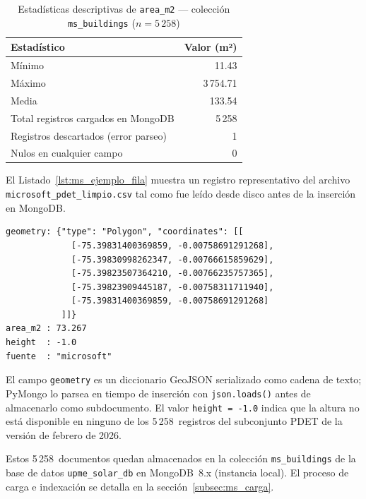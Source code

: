 \documentclass[12pt, a4paper]{report}
\begin{document}
\begin{table}[H]
  \centering
  \caption{Estadísticas descriptivas de \texttt{area\_m2} ---
           colección \texttt{ms\_buildings} ($n = 5\,258$)}
  \label{tab:ms_stats}
  \begin{tabular}{lr}
    \toprule
    \textbf{Estadístico} & \textbf{Valor (m²)} \\
    \midrule
    Mínimo   & 11.43  \\
    Máximo   & 3\,754.71 \\
    Media    & 133.54 \\
    \midrule
    Total registros cargados en MongoDB & 5\,258 \\
    Registros descartados (error parseo) & 1 \\
    Nulos en cualquier campo            & 0 \\
    \bottomrule
  \end{tabular}
\end{table}

El Listado~\ref{lst:ms_ejemplo_fila} muestra un registro representativo
del archivo \texttt{microsoft\_pdet\_limpio.csv} tal como fue leído desde
disco antes de la inserción en MongoDB.

\begin{lstlisting}[caption={Ejemplo de fila real en \texttt{microsoft\_pdet\_limpio.csv}},
                   label={lst:ms_ejemplo_fila}]
geometry: {"type": "Polygon", "coordinates": [[
             [-75.39831400369859, -0.00758691291268],
             [-75.39830998262347, -0.00766615859629],
             [-75.39823507364210, -0.00766235757365],
             [-75.39823909445187, -0.00758311711940],
             [-75.39831400369859, -0.00758691291268]
           ]]}
area_m2 : 73.267
height  : -1.0
fuente  : "microsoft"
\end{lstlisting}

\noindent
El campo \texttt{geometry} es un diccionario GeoJSON serializado como
cadena de texto; PyMongo lo parsea en tiempo de inserción con
\texttt{json.loads()} antes de almacenarlo como subdocumento.
El valor \texttt{height = -1.0} indica que la altura no está disponible
en ninguno de los 5\,258~registros del subconjunto PDET de la versión
de febrero de 2026.

\noindent
Estos 5\,258~documentos quedan almacenados en la colección
\texttt{ms\_buildings} de la base de datos \texttt{upme\_solar\_db}
en MongoDB~8.x (instancia local). El proceso de carga e indexación
se detalla en la sección~\ref{subsec:ms_carga}.
\end{document}
